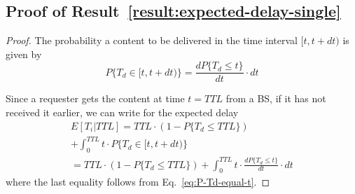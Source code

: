 \documentclass[10pt,conference,letterpaper]{IEEEtran}
\newcommand{\eq}[1]{Eq.~\eqref{#1}}
\begin{document}
\subsection{Proof of Result~\ref{result:expected-delay-single}}\label{appendix:proof-delay}
\begin{proof}
The probability a content to be delivered in the time interval $[t,t+dt)$ is given by
\begin{equation}\label{eq:P-Td-equal-t}
P\{T_{d}\in[t,t+dt)\}= \frac{dP\{T_{d}\leq t\}}{dt}\cdot dt 
\end{equation}

Since a requester gets the content at time $t=TTL$ from a BS, if it has not received it earlier, we can write for the expected delay
\begin{multline}\label{eq:expectation-conditional-generic}
E[T_{i}|TTL] =TTL\cdot (1-P\{T_{d}\leq TTL\}) \\+ \int_{0}^{TTL}t\cdot P\{T_{d}\in[t,t+dt)\}\\
			 = TTL\cdot (1-P\{T_{d}\leq TTL\}) + \int_{0}^{TTL}t\cdot \frac{dP\{T_{d}\leq t\}}{dt} \cdot dt
\end{multline}
where the last equality follows from \eq{eq:P-Td-equal-t}.


\end{proof}
\end{document}
